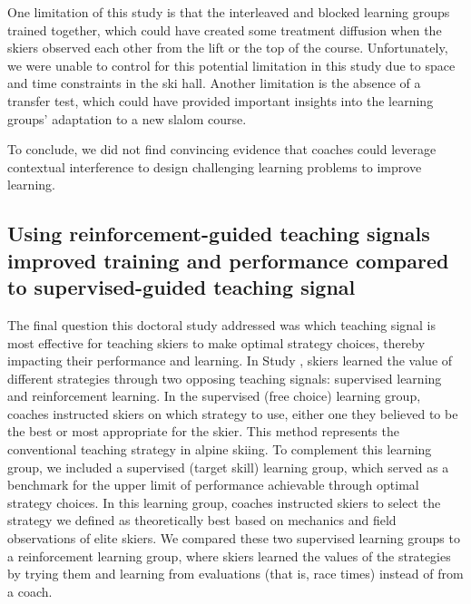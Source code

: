 One limitation of this study is that the interleaved and blocked learning groups trained together, which could have created some treatment diffusion when the skiers observed each other from the lift or the top of the course. Unfortunately, we were unable to control for this potential limitation in this study due to space and time constraints in the ski hall. Another limitation is the absence of a transfer test, which could have provided important insights into the learning groups’ adaptation to a new slalom course.

To conclude, we did not find convincing evidence that coaches could leverage contextual interference to design challenging learning problems to improve learning.

\subsection{Using reinforcement-guided teaching signals improved training and performance compared to supervised-guided teaching signal}
The final question this doctoral study addressed was which teaching signal is most effective for teaching skiers to make optimal strategy choices, thereby impacting their performance and learning. In Study , skiers learned the value of different strategies through two opposing teaching signals: supervised learning and reinforcement learning. In the supervised (free choice) learning group, coaches instructed skiers on which strategy to use, either one they believed to be the best or most appropriate for the skier. This method represents the conventional teaching strategy in alpine skiing. To complement this learning group, we included a supervised (target skill) learning group, which served as a benchmark for the upper limit of performance achievable through optimal strategy choices. In this learning group, coaches instructed skiers to select the strategy we defined as theoretically best based on mechanics and field observations of elite skiers. We compared these two supervised learning groups to a reinforcement learning group, where skiers learned the values of the strategies by trying them and learning from evaluations (that is, race times) instead of from a coach. 

